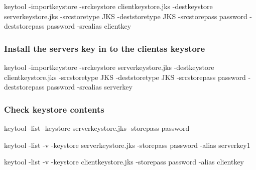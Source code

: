 \begin{DoxyItemize}
\item keytool -\/importkeystore -\/srckeystore clientkeystore.\+jks -\/destkeystore serverkeystore.\+jks -\/srcstoretype J\+K\+S -\/deststoretype J\+K\+S -\/srcstorepass password -\/deststorepass password -\/srcalias clientkey 
\end{DoxyItemize}\subsubsection*{Install the server\textquotesingle{}s key in to the clients\textquotesingle{}s keystore}


\begin{DoxyItemize}
\item keytool -\/importkeystore -\/srckeystore serverkeystore.\+jks -\/destkeystore clientkeystore.\+jks -\/srcstoretype J\+K\+S -\/deststoretype J\+K\+S -\/srcstorepass password -\/deststorepass password -\/srcalias serverkey 
\end{DoxyItemize}\subsubsection*{Check keystore contents}


\begin{DoxyItemize}
\item keytool -\/list -\/keystore serverkeystore.\+jks -\/storepass password 
\item keytool -\/list -\/v -\/keystore serverkeystore.\+jks -\/storepass password -\/alias serverkey1 
\item keytool -\/list -\/v -\/keystore clientkeystore.\+jks -\/storepass password -\/alias clientkey 
\begin{DoxyItemize}
\item 
\end{DoxyItemize}
\end{DoxyItemize}